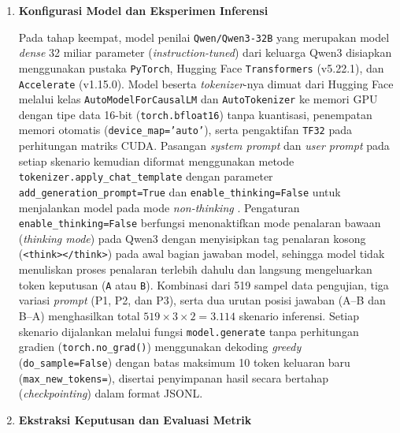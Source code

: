 \begin{enumerate}
  \item \textbf{Konfigurasi Model dan Eksperimen Inferensi}

  Pada tahap keempat, model penilai \texttt{Qwen/\allowbreak Qwen3-\allowbreak 32B} \cite{yangQwen3TechnicalReport2025} yang merupakan model \textit{dense} 32 miliar parameter (\textit{instruction-tuned}) dari keluarga Qwen3 disiapkan menggunakan pustaka \texttt{PyTorch}, Hugging Face \texttt{Transformers} (v5.22.1), dan \texttt{Accelerate} (v1.15.0). Model beserta \textit{tokenizer}-nya dimuat dari Hugging Face melalui kelas \texttt{AutoModel\allowbreak ForCausalLM} dan \texttt{Auto\allowbreak Tokenizer} ke memori GPU dengan tipe data 16-bit (\texttt{torch.\allowbreak bfloat16}) tanpa kuantisasi, penempatan memori otomatis (\texttt{device\_\allowbreak map=\allowbreak 'auto'}), serta pengaktifan \texttt{TF32} pada perhitungan matriks CUDA. Pasangan \textit{system prompt} dan \textit{user prompt} pada setiap skenario kemudian diformat menggunakan metode \texttt{tokenizer.\allowbreak apply\_\allowbreak chat\_\allowbreak template} dengan parameter \texttt{add\_\allowbreak generation\_\allowbreak prompt=\allowbreak True} dan \texttt{enable\_\allowbreak thinking=\allowbreak False} untuk menjalankan model pada mode \textit{non-thinking} \cite{yangQwen3TechnicalReport2025}. Pengaturan \texttt{enable\_\allowbreak thinking=\allowbreak False} berfungsi menonaktifkan mode penalaran bawaan (\textit{thinking mode}) pada Qwen3 dengan menyisipkan tag penalaran kosong (\texttt{<think>\allowbreak </think>}) pada awal bagian jawaban model, sehingga model tidak menuliskan proses penalaran terlebih dahulu dan langsung mengeluarkan token keputusan (\texttt{A} atau \texttt{B}). Kombinasi dari 519 sampel data pengujian, tiga variasi \textit{prompt} (P1, P2, dan P3), serta dua urutan posisi jawaban (A--B dan B--A) menghasilkan total $519 \times 3 \times 2 = 3.114$ skenario inferensi. Setiap skenario dijalankan melalui fungsi \texttt{model.\allowbreak generate} tanpa perhitungan gradien (\texttt{torch.\allowbreak no\_\allowbreak grad()}) menggunakan dekoding \textit{greedy} (\texttt{do\_\allowbreak sample=\allowbreak False}) dengan batas maksimum 10 token keluaran baru (\texttt{max\_\allowbreak new\_\allowbreak tokens=}), disertai penyimpanan hasil secara bertahap (\textit{checkpointing}) dalam format JSONL.

  \item \textbf{Ekstraksi Keputusan dan Evaluasi Metrik}


\end{enumerate}
